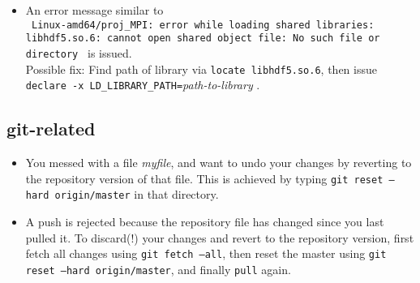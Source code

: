 \begin{itemize}
\item An error message similar to \\
  {\tt
    Linux-amd64/proj\_MPI: error while loading shared libraries:
    libhdf5.so.6: cannot open shared object file: No such file
    or directory } is issued. \\
  Possible fix:
  Find path of library via \verb+locate libhdf5.so.6+, then issue \\
  \verb+declare -x LD_LIBRARY_PATH=+\textit{path-to-library} .
\end{itemize}


\subsection{git-related}

\begin{itemize}
\item You messed with a file \textit{myfile}, and want to undo your changes
  by reverting to the repository version of that file. This is achieved by
  typing \mbox{\tt git reset --hard origin/master} in that directory.
\item A push is rejected because the repository file has changed since you
  last pulled it. To discard(!) your changes and revert to the repository
  version, first fetch all changes using {\tt git fetch --all}, then reset the
  master using \mbox{\tt git reset --hard origin/master}, and finally
  {\tt pull} again.
\end{itemize}
